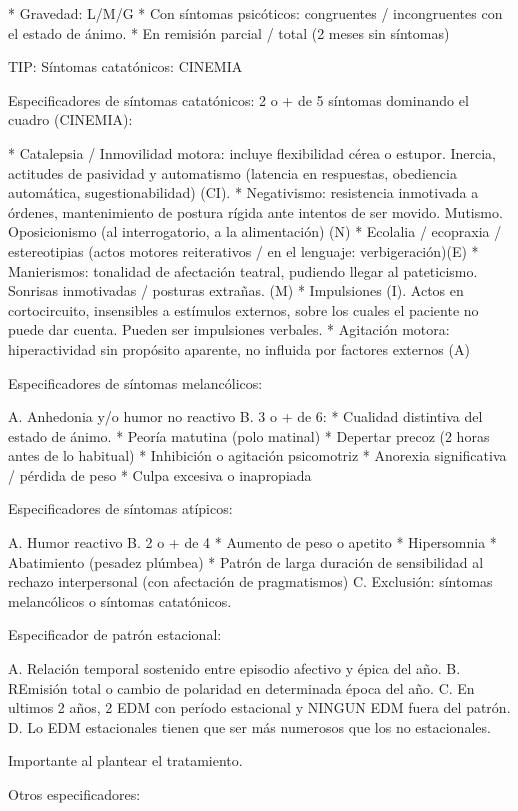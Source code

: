 \documentclass[encares.tex]{subfiles}
\begin{document}
* Gravedad: L/M/G
* Con síntomas psicóticos: congruentes / incongruentes con el estado de ánimo.
* En remisión parcial / total (2 meses sin síntomas)

TIP: Síntomas catatónicos: CINEMIA

Especificadores de síntomas catatónicos: 2 o + de 5 síntomas dominando el cuadro (CINEMIA):

* Catalepsia / Inmovilidad motora: incluye flexibilidad cérea o estupor. Inercia, actitudes de pasividad y automatismo (latencia en respuestas, obediencia automática, sugestionabilidad) (CI).
* Negativismo: resistencia inmotivada a órdenes, mantenimiento de postura rígida ante intentos de ser movido. Mutismo. Oposicionismo (al interrogatorio, a la alimentación) (N)
* Ecolalia / ecopraxia / estereotipias (actos motores reiterativos / en el lenguaje: verbigeración)(E)
* Manierismos: tonalidad de afectación teatral, pudiendo llegar al pateticismo. Sonrisas inmotivadas / posturas extrañas. (M)
* Impulsiones (I). Actos en cortocircuito, insensibles a estímulos externos, sobre los cuales el paciente no puede dar cuenta. Pueden ser impulsiones verbales.
* Agitación motora: hiperactividad sin propósito aparente, no influida por factores externos (A)

Especificadores de síntomas melancólicos:

A. Anhedonia y/o humor no reactivo
B. 3 o + de 6:
* Cualidad distintiva del estado de ánimo.
* Peoría matutina (polo matinal)
* Depertar precoz (2 horas antes de lo habitual)
* Inhibición o agitación psicomotriz
* Anorexia significativa / pérdida de peso
* Culpa excesiva o inapropiada

Especificadores de síntomas atípicos:

A. Humor reactivo
B. 2 o + de 4
* Aumento de peso o apetito
* Hipersomnia
* Abatimiento (pesadez plúmbea)
* Patrón de larga duración de sensibilidad al rechazo interpersonal (con afectación de pragmatismos)
C. Exclusión: síntomas melancólicos o síntomas catatónicos.

Especificador de patrón estacional:

A. Relación temporal sostenido entre episodio afectivo y épica del año.
B. REmisión total o cambio de polaridad en determinada época del año.
C. En ultimos 2 años, 2 EDM con período estacional y NINGUN EDM fuera del patrón.
D. Lo EDM estacionales tienen que ser más numerosos que los no estacionales.

Importante al plantear el tratamiento.

Otros especificadores:
\end{document}
